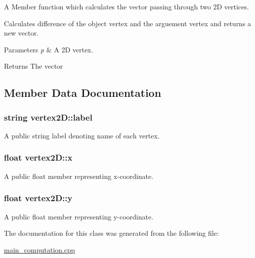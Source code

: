 A Member function which calculates the vector passing through two 2D vertices. 

Calculates difference of the object vertex and the arguement vertex and returns a new vector. 
\begin{DoxyParams}{Parameters}
{\em p} & A 2D vertex. \\
\hline
\end{DoxyParams}
\begin{DoxyReturn}{Returns}
The vector 
\end{DoxyReturn}


\subsection{Member Data Documentation}
\subsubsection[{\texorpdfstring{label}{label}}]{\setlength{\rightskip}{0pt plus 5cm}string vertex2\+D\+::label}\hypertarget{classvertex2D_a31103db4a64afce24d3d292f62ee3f3e}{}\label{classvertex2D_a31103db4a64afce24d3d292f62ee3f3e}


A public string label denoting name of each vertex. 

\subsubsection[{\texorpdfstring{x}{x}}]{\setlength{\rightskip}{0pt plus 5cm}float vertex2\+D\+::x}\hypertarget{classvertex2D_a2ba74d18c3e8e5a36fd2846a7a4d1a4f}{}\label{classvertex2D_a2ba74d18c3e8e5a36fd2846a7a4d1a4f}


A public float member representing x-\/coordinate. 

\subsubsection[{\texorpdfstring{y}{y}}]{\setlength{\rightskip}{0pt plus 5cm}float vertex2\+D\+::y}\hypertarget{classvertex2D_a6ca32b6427f8d3ce3437db0bafd92a00}{}\label{classvertex2D_a6ca32b6427f8d3ce3437db0bafd92a00}


A public float member representing y-\/coordinate. 



The documentation for this class was generated from the following file\+:\begin{DoxyCompactItemize}
\item 
\hyperlink{main__computation_8cpp}{main\+\_\+computation.\+cpp}\end{DoxyCompactItemize}
